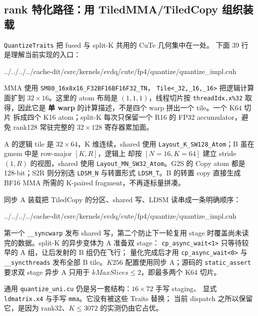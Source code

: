 \subsection{rank 特化路径：用 TiledMMA/TiledCopy 组织装载}

\texttt{QuantizeTraits} 把 fused 与 split-K 共用的 CuTe 几何集中在一处。
下面 39 行是理解当前实现的入口：

\begin{lstinputlisting}[linerange={62-100},firstnumber=auto,
  title={quantize\_impl.cuh L62-100（MMA、shared layout 与 Copy atom）}]{../../../../cache-dit/csrc/kernels/svdq/cute/fp4/quantize/quantize_impl.cuh}
\end{lstinputlisting}

MMA 使用 \texttt{SM80\_16x8x16\_F32BF16BF16F32\_TN}，
\texttt{Tile<\_32,\_16,\_16>} 把逻辑计算面扩到 $32\times16$。这里的
atom 布局是 $(1,1,1)$，线程切片按 \texttt{threadIdx.x\%32} 取得，因此它是
\textbf{单 warp} 的计算描述，不是四个 warp 拼出一个 tile。一个 K64 切片
拆成四个 K16 atom；split-K 每次只保留一个 R16 的 FP32 accumulator，避免
rank128 常驻完整的 $32\times128$ 寄存器累加面。

A 的逻辑 tile 是 $32\times64$，K 维连续，shared 使用
\texttt{Layout\_K\_SW128\_Atom}；B 虽在 gmem 中是 row-major $[K,R]$，逻辑上
却按 $[N=16,K=64]$ 建立 stride $(1,R)$ 的视图，shared 使用
\texttt{Layout\_MN\_SW32\_Atom}。G2S 的 Copy atom 都是 128-bit；S2R 则分别选
\texttt{LDSM\_N} 与转置形式 \texttt{LDSM\_T}。B 的转置 copy 直接生成 BF16
MMA 所需的 K-paired fragment，不再逐标量拼凑。

同步 A 装载把 TiledCopy 的分区、shared 写、LDSM 读串成一条明确顺序：

\begin{lstinputlisting}[linerange={280-306},firstnumber=auto,
  title={quantize\_impl.cuh L280-306（A 的 G2S、LDSM 与 warp 同步）}]{../../../../cache-dit/csrc/kernels/svdq/cute/fp4/quantize/quantize_impl.cuh}
\end{lstinputlisting}

第一个 \texttt{\_\_syncwarp} 发布 shared 写，第二个防止下一轮复用 stage
时覆盖尚未读完的数据。split-K 的异步变体为 A 准备双 stage：
\texttt{cp\_async\_wait<1>} 只等待较早的 A 组，让后发射的 B 组仍在飞行；
量化完成后才用 \texttt{cp\_async\_wait<0>} 与 \texttt{\_\_syncthreads}
发布全部 B tile。$K256$ 配置使用同步 A；源码的 \texttt{static\_assert}
要求双 stage 异步 A 只用于 $kMaxSlices\le2$，即最多两个 K64 切片。

通用 \texttt{quantize\_uni.cu} 仍是另一套结构：$16\times72$ 手写 staging、
显式 \texttt{ldmatrix.x4} 与手写 \texttt{mma}。它没有被这些 Traits 替换；
当前 dispatch 之所以保留它，是因为 rank32、$K\le3072$ 的实测仍由它占优。

